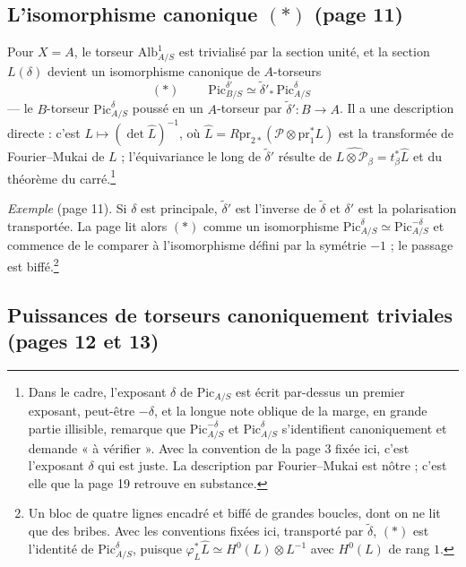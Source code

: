 \documentclass[11pt,a4paper]{article}
\begin{document}
\subsection*{L'isomorphisme canonique $(*)$ (page 11)}

Pour $X = A$, le torseur $\mathrm{Alb}^{1}_{A/S}$ est trivialisé par la section
unité, et la section $L(\delta)$ devient un isomorphisme canonique de
$A$-torseurs
\[
(*) \qquad
\boxed{\;\mathrm{Pic}^{\delta'}_{B/S} \simeq \tilde{\delta}'_{*}\,\mathrm{Pic}^{\delta}_{A/S}\;}
\]
— le $B$-torseur $\mathrm{Pic}^{\delta}_{A/S}$ poussé en un $A$-torseur par
$\tilde{\delta}' : B \to A$. Il a une description directe : c'est
$L \mapsto (\det \widehat{L})^{-1}$, où $\widehat{L} = R\mathrm{pr}_{2*}
(\mathcal{P} \otimes \mathrm{pr}_1^{*}L)$ est la transformée de Fourier--Mukai
de $L$ ; l'équivariance le long de $\tilde{\delta}'$ résulte de
$\widehat{L \otimes \mathcal{P}_{\beta}} = t_{\beta}^{*}\widehat{L}$ et du
théorème du carré.\footnote{Dans le cadre, l'exposant $\delta$ de
$\mathrm{Pic}_{A/S}$ est écrit par-dessus un premier exposant, peut-être
$-\delta$, et la longue note oblique de la marge, en grande partie illisible,
remarque que $\mathrm{Pic}^{-\delta}_{A/S}$ et $\mathrm{Pic}^{\delta}_{A/S}$
s'identifient canoniquement et demande « à vérifier ». Avec la convention de
la page 3 fixée ici, c'est l'exposant $\delta$ qui est juste. La description
par Fourier--Mukai est nôtre ; c'est elle que la page 19 retrouve en
substance.}

\emph{Exemple} (page 11). Si $\delta$ est principale, $\tilde{\delta}'$ est
l'inverse de $\tilde{\delta}$ et $\delta'$ est la polarisation transportée. La
page lit alors $(*)$ comme un isomorphisme $\mathrm{Pic}^{\delta}_{A/S} \simeq
\mathrm{Pic}^{-\delta}_{A/S}$ et commence de le comparer à l'isomorphisme
défini par la symétrie $-1$ ; le passage est biffé.\footnote{Un bloc de quatre
lignes encadré et biffé de grandes boucles, dont on ne lit que des bribes. Avec
les conventions fixées ici, transporté par $\tilde{\delta}$, $(*)$ est
l'identité de $\mathrm{Pic}^{\delta}_{A/S}$, puisque $\varphi_L^{*}\widehat{L}
\simeq H^{0}(L) \otimes L^{-1}$ avec $H^{0}(L)$ de rang $1$.}

\subsection*{Puissances de torseurs canoniquement triviales (pages 12 et 13)}
\end{document}
